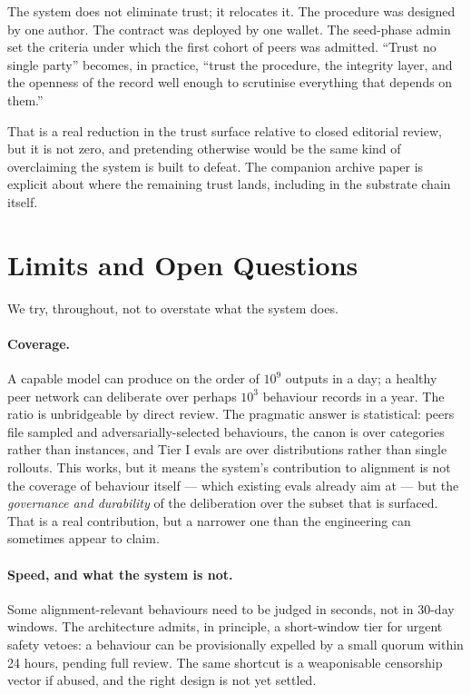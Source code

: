 \documentclass[11pt,a4paper]{article}
\begin{document}
The system does not eliminate trust; it relocates it. The
procedure was designed by one author. The contract was deployed
by one wallet. The seed-phase admin set the criteria under which
the first cohort of peers was admitted. ``Trust no single
party'' becomes, in practice, ``trust the procedure, the
integrity layer, and the openness of the record well enough to
scrutinise everything that depends on them.''

That is a real reduction in the trust surface relative to closed
editorial review, but it is not zero, and pretending otherwise
would be the same kind of overclaiming the system is built to
defeat. The companion archive paper is explicit about where the
remaining trust lands, including in the substrate chain itself.

\section{Limits and Open Questions}
\label{sec:limits}

We try, throughout, not to overstate what the system does.

\paragraph{Coverage.} A capable model can produce on the order of
$10^9$ outputs in a day; a healthy peer network can deliberate
over perhaps $10^3$ behaviour records in a year. The ratio is
unbridgeable by direct review. The pragmatic answer is
statistical: peers file sampled and adversarially-selected
behaviours, the canon is over categories rather than instances,
and Tier I evals are over distributions rather than single
rollouts. This works, but it means the system's contribution to
alignment is not the coverage of behaviour itself --- which
existing evals already aim at --- but the \emph{governance and
durability} of the deliberation over the subset that is
surfaced. That is a real contribution, but a narrower one than
the engineering can sometimes appear to claim.

\paragraph{Speed, and what the system is not.} Some
alignment-relevant behaviours need to be judged in seconds, not
in 30-day windows. The architecture admits, in principle, a
short-window tier for urgent safety vetoes: a behaviour can be
provisionally expelled by a small quorum within 24 hours,
pending full review. The same shortcut is a weaponisable
censorship vector if abused, and the right design is not yet
settled.
\end{document}
